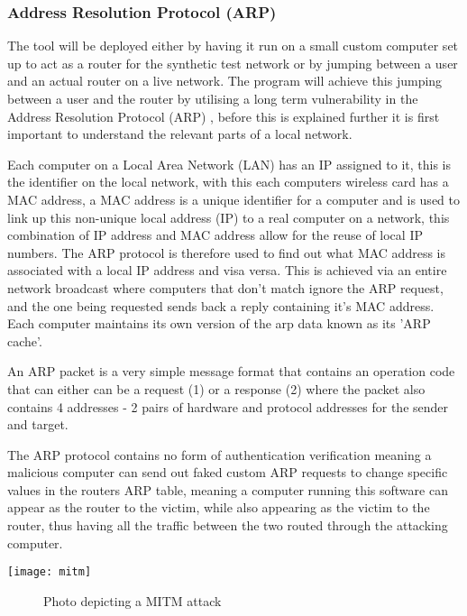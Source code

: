 \subsubsection{Address Resolution Protocol (ARP)}
The tool will be deployed either by having it run on a small custom computer set up to act as a router for the synthetic test network or by jumping between a user and an actual router on a live network. The program will achieve this jumping between a user and the router by utilising a long term vulnerability in the Address Resolution Protocol (ARP) \citep{arp2001}, before this is explained further it is first important to understand the relevant parts of a local network.

Each computer on a Local Area Network (LAN) has an IP assigned to it, this is the identifier on the local network, with this each computers wireless card has a MAC address, a MAC address is a unique identifier for a computer and is used to link up this non-unique local address (IP) to a real computer on a network, this combination of IP address and MAC address allow for the reuse of local IP numbers. The ARP protocol is therefore used to find out what MAC address is associated with a local IP address and visa versa. This is achieved via an entire network broadcast where computers that don't match ignore the ARP request, and the one being requested sends back a reply containing it's MAC address. Each computer maintains its own version of the arp data known as its 'ARP cache'.

An ARP packet is a very simple message format that contains an operation code that can either can be a request (1) or a response (2) where the packet also contains 4 addresses - 2 pairs of hardware and protocol addresses for the sender and target.

The ARP protocol contains no form of authentication verification meaning a malicious computer can send out faked custom ARP requests to change specific values in the routers ARP table, meaning a computer running this software can appear as the router to the victim, while also appearing as the victim to the router, thus having all the traffic between the two routed through the attacking computer. 

\begin{center}
\texttt{[image: mitm]}
	\begin{figure}[h]
		\caption{Photo depicting a MITM attack}
	\end{figure}
\end{center}

